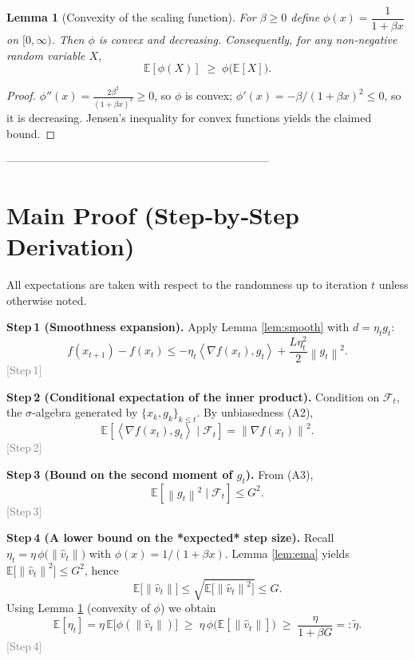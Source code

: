 \documentclass{article}
\newcommand{\E}{\mathbb{E}}
\newcommand{\norm}[1]{\left\|#1\right\|}
\newcommand{\ip}[2]{\left\langle #1,#2\right\rangle}
\newcommand{\grad}{\nabla}
\newtheorem{lemma}{Lemma}
\begin{document}
\begin{lemma}[Convexity of the scaling function]\label{lem:phi}
For $\beta\ge0$ define $\phi(x)=\dfrac{1}{1+\beta x}$ on $[0,\infty)$.  
Then $\phi$ is convex and decreasing. Consequently, for any non‑negative random variable $X$,
\[
\E[\phi(X)]\;\ge\;\phi\bigl(\E[X]\bigr).
\tag{L3}
\]
\end{lemma}
\begin{proof}
$\phi''(x)=\frac{2\beta^{2}}{(1+\beta x)^{3}}\ge0$, so $\phi$ is convex; $\phi'(x)=-\beta/(1+\beta x)^{2}\le0$, so it is decreasing. Jensen’s inequality for convex functions yields the claimed bound.
\end{proof}

-----------------------------------------------------------------------

\section*{Main Proof (Step‑by‑Step Derivation)}
All expectations are taken with respect to the randomness up to iteration $t$ unless otherwise noted.

\noindent\textbf{Step 1 (Smoothness expansion).}  
Apply Lemma \ref{lem:smooth} with $d=\eta_{t}g_{t}$:
\[
f(x_{t+1})-f(x_{t})\le -\eta_{t}\ip{\grad f(x_{t})}{g_{t}}
                     +\frac{L\eta_{t}^{2}}{2}\norm{g_{t}}^{2}.
\tag{6}
\]
\textcolor{gray}{[Step 1]}

\noindent\textbf{Step 2 (Conditional expectation of the inner product).}  
Condition on $\mathcal{F}_{t}$, the $\sigma$‑algebra generated by $\{x_{k},g_{k}\}_{k\le t}$. By unbiasedness (A2),
\[
\E\!\left[\ip{\grad f(x_{t})}{g_{t}}\mid\mathcal{F}_{t}\right]
= \norm{\grad f(x_{t})}^{2}.
\tag{7}
\]
\textcolor{gray}{[Step 2]}

\noindent\textbf{Step 3 (Bound on the second moment of $g_{t}$).}  
From (A3),
\[
\E\!\left[\norm{g_{t}}^{2}\mid\mathcal{F}_{t}\right]\le G^{2}.
\tag{8}
\]
\textcolor{gray}{[Step 3]}

\noindent\textbf{Step 4 (A lower bound on the *expected* step size).}  
Recall $\eta_{t}= \eta\,\phi\!\bigl(\norm{\hat v_{t}}\bigr)$ with $\phi(x)=1/(1+\beta x)$.  
Lemma \ref{lem:ema} yields $\E\!\bigl[\norm{\hat v_{t}}^{2}\bigr]\le G^{2}$, hence
\[
\E\!\bigl[\norm{\hat v_{t}}\bigr]\le\sqrt{\E\!\bigl[\norm{\hat v_{t}}^{2}\bigr]}\le G.
\]
Using Lemma \ref{lem:phi} (convexity of $\phi$) we obtain
\[
\E[\eta_{t}]
= \eta\,\E\!\bigl[\phi(\norm{\hat v_{t}})\bigr]
\;\ge\;
\eta\,\phi\!\bigl(\E[\norm{\hat v_{t}}]\bigr)
\;\ge\;
\frac{\eta}{1+\beta G}
=: \tilde\eta .
\tag{9}
\]
\textcolor{gray}{[Step 4]}
\end{document}
